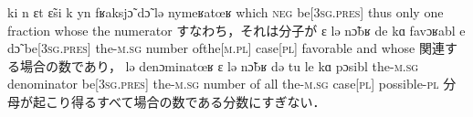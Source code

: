 \documentclass{ltjsarticle}
\newcommand\liaison{\hspace*{0.1em}\raisebox{-0.8ex}{\rotatebox{90}{(}}\hspace*{0.1em}}
\begin{document}
         {ki n {ɛt{\liaison}} \~{ɛ}si {k{\liaison}} yn fʁaksj\~{ɔ} d\~{ɔ} lə {nymeʁatœʁ\liaison}}
         {which \textsc{neg} {be[3\textsc{sg}.\textsc{pres}]} thus only one fraction whose the numerator}
         {すなわち，それは分子が}
         {ɛ lə n\~{ɔ}bʁ de kɑ favɔʁabl e d\~{ɔ}}
         {{be[3\textsc{sg}.\textsc{pres}]} the-\textsc{m}.\textsc{sg} number {of{\textunderscore}the[\textsc{m}.\textsc{pl}]} {case[\textsc{pl}]} favorable and whose}
         {関連する場合の数であり，}
         {lə {denɔminatœʁ\liaison} ɛ lə n\~{ɔ}bʁ də tu le kɑ pɔsibl}
         {the-\textsc{m}.\textsc{sg} denominator {be[3\textsc{sg}.\textsc{pres}]} the-\textsc{m}.\textsc{sg} number of all the-\textsc{m}.\textsc{sg} case[\textsc{pl}] possible-\textsc{pl}}
         {分母が起こり得るすべて場合の数である分数にすぎない．}
\end{document}
